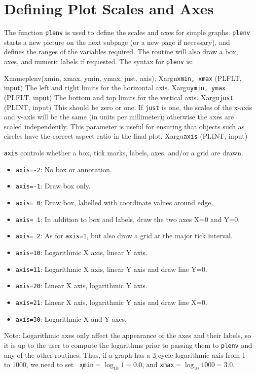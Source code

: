 \section{Defining Plot Scales and Axes}

The function {\tt plenv} is used to define the scales and axes for simple
graphs. {\tt plenv} starts a new picture on the next subpage (or a new page
if necessary), and defines the ranges of the variables required. The
routine will also draw a box, axes, and numeric labels if requested.
The syntax for {\tt plenv} is:

Xname{plenv(xmin, xmax, ymin, ymax, just, axis);}
Xargu{{\tt xmin, xmax} (PLFLT, input)}
{The left and right limits for the horizontal axis.}
Xargu{{\tt ymin, ymax} (PLFLT, input)}
{The bottom and top limits for the vertical axis.}
Xargu{{\tt just} (PLINT, input)}
{This should be zero or one. If {\tt just} is one, the scales of the
x-axis and
y-axis will be the same (in units per millimeter); otherwise the axes are
scaled independently. This parameter is useful for ensuring that objects
such as circles have the correct aspect ratio in the final plot.}
Xargu{{\tt axis} (PLINT, input)}
{{\tt axis} controls whether a box, tick marks, labels, axes, and/or a
grid are drawn.
\begin{itemize}
     \item {\tt axis=-2}: No box or annotation.
     \item {\tt axis=-1}: Draw box only.
     \item {\tt axis= 0}: Draw box, labelled with coordinate values around edge.
     \item {\tt axis= 1}: In addition to box and labels, draw the two axes
                          X=0 and Y=0.
     \item {\tt axis= 2}: As for {\tt axis=1}, but also draw a grid at the major tick interval.
     \item {\tt axis=10}: Logarithmic X axis, linear Y axis.
     \item {\tt axis=11}: Logarithmic X axis, linear Y axis and draw line Y=0.
     \item {\tt axis=20}: Linear X axis, logarithmic Y axis.
     \item {\tt axis=21}: Linear X axis, logarithmic Y axis and draw line X=0.
     \item {\tt axis=30}: Logarithmic X and Y axes.
\end{itemize}
}

Note: Logarithmic axes only affect the appearance of the axes and their
labels, so it is up to the user to compute the logarithms prior to passing
them to {\tt plenv} and any of the other routines. Thus, if a graph has a
\c 3-cycle logarithmic axis from 1 to 1000, we need to set {\tt
\c xmin}$=\log_{10}1=0.0$, and {\tt xmax}$=\log_{10}1000=3.0$. 

